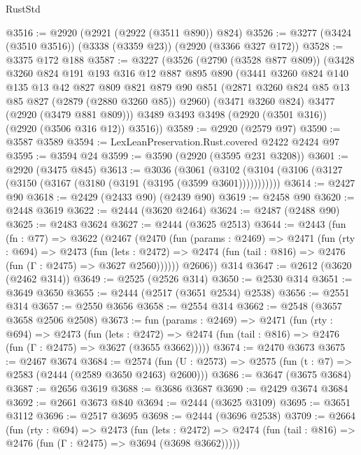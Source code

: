 \begin{lexlean}{RustStd}
\begin{coremodule}
@3516 := @2920 (@2921 (@2922 (@3511 @890)) @824)
@3526 := @3277 (@3424 (@3510 @3516)) (@3338 (@3359 @23)) (@2920 (@3366 @327 @172))
@3528 := @3375 @172 @188
@3587 := @3227
    (@3526
      (@2790 (@3528 @877 @809))
      (@3428
        @3260
        @824
        @191
        @193
        @316
        @12
        @887
        @895
        @890
        (@3441
          @3260
          @824
          @140
          @135
          @13
          @42
          @827
          @809
          @821
          @879
          @90
          @851
          (@2871 @3260 @824 @85 @13 @85 @827 (@2879 (@2880 @3260 @85)) @2960)
          (@3471 @3260 @824)
          @3477
          (@2920 (@3479 @881 @809)))
        @3489
        @3493
        @3498
        (@2920 (@3501 @316))
        (@2920 (@3506 @316 @12))
        @3516))
@3589 := @2920 (@2579 @97)
@3590 := @3587 @3589
@3594 := LexLeanPreservation.Rust.covered @2422 @2424 @97
@3595 := @3594 @24
@3599 := @3590 (@2920 (@3595 @231 @3208))
@3601 := @2920 (@3475 @845)
@3613 := @3036
    (@3061 (@3102 (@3104 (@3106 (@3127 (@3150 (@3167 (@3180 (@3191 (@3195 (@3599 @3601)))))))))))
@3614 := @2427 @90
@3618 := @2429 (@2433 @90) (@2439 @90)
@3619 := @2458 @90
@3620 := @2448 @3619
@3622 := @2444 (@3620 @2464)
@3624 := @2487 (@2488 @90)
@3625 := @2483 @3624
@3627 := @2444 (@3625 @2513)
@3644 := @2443
    (fun (fn : @77) =>
    @3622
      (@2467
        (@2470
          (fun (params : @2469) =>
          @2471
            (fun (rty : @694) =>
            @2473
              (fun (lets : @2472) =>
              @2474 (fun (tail : @816) => @2476 (fun (Γ : @2475) => @3627 @2560))))))
        @2606))
    @314
@3647 := @2612 (@3620 (@2462 @314))
@3649 := @2525 (@2526 @314)
@3650 := @2530 @314
@3651 := @3649 @3650
@3655 := @2444 (@2517 (@3651 @2534) @2538)
@3656 := @2551 @314
@3657 := @2550 @3656
@3658 := @2554 @314
@3662 := @2548 (@3657 @3658 @2506 @2508)
@3673 := fun (params : @2469) =>
  @2471
    (fun (rty : @694) =>
    @2473
      (fun (lets : @2472) =>
      @2474 (fun (tail : @816) => @2476 (fun (Γ : @2475) => @3627 (@3655 @3662)))))
@3674 := @2470 @3673
@3675 := @2467 @3674
@3684 := @2574 (fun (U : @2573) => @2575 (fun (t : @7) => @2583 (@2444 (@2589 @3650 @2463) @2600)))
@3686 := @3647 (@3675 @3684)
@3687 := @2656 @3619
@3688 := @3686 @3687
@3690 := @2429 @3674 @3684
@3692 := @2661 @3673 @840
@3694 := @2444 (@3625 @3109)
@3695 := @3651 @3112
@3696 := @2517 @3695
@3698 := @2444 (@3696 @2538)
@3709 := @2664
    (fun (rty : @694) =>
    @2473
      (fun (lets : @2472) =>
      @2474 (fun (tail : @816) => @2476 (fun (Γ : @2475) => @3694 (@3698 @3662)))))

\end{coremodule}
\end{lexlean}
